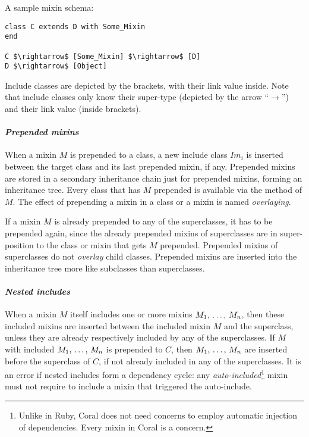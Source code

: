 \example A sample mixin schema:
\begin{lstlisting}
class C extends D with Some_Mixin
end

C $\rightarrow$ [Some_Mixin] $\rightarrow$ [D]
D $\rightarrow$ [Object]
\end{lstlisting}
Include classes are depicted by the brackets, with their link value inside. Note that include classes only know their super-type (depicted by the arrow ``$\rightarrow$'') and their link value (inside brackets). 

\paragraph{\em Prepended mixins}
When a mixin $M$ is prepended to a class, a new include class $Im_i$ is inserted between the target class and its last prepended mixin, if any. Prepended mixins are stored in a secondary inheritance chain just for prepended mixins, forming an inheritance tree. Every class that has $M$ prepended is available via the  method of $M$. The effect of prepending a mixin in a class or a mixin is named {\em overlaying}. 

If a mixin $M$ is already prepended to any of the superclasses, it has to be prepended again, since the already prepended mixins of superclasses are in super-position to the class or mixin that gets $M$ prepended. Prepended mixins of superclasses do not {\em overlay} child classes. Prepended mixins are inserted into the inheritance tree more like subclasses than superclasses. 

\paragraph{\em Nested includes}
When a mixin $M$ itself includes one or more mixins $M_1 ,\, \ldots ,\, M_n$, then these included mixins are inserted between the included mixin $M$ and the superclass, unless they are already respectively included by any of the superclasses. If $M$ with included $M_1 ,\, \ldots ,\, M_n$ is prepended to $C$, then $M_1 ,\, \ldots ,\, M_n$ are inserted before the superclass of $C$, if not already included in any of the superclasses. It is an error if nested includes form a dependency cycle: any {\em auto-included}\footnote{Unlike in Ruby, Coral does not need concerns to employ automatic injection of dependencies. Every mixin in Coral is a concern.} mixin must not require to include a mixin that triggered the auto-include. 


